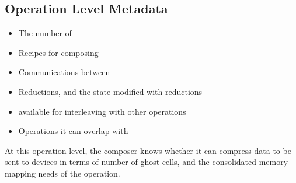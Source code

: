 \documentclass{article}
\begin{document}

\subsection{Operation Level Metadata}
\begin{itemize}
\item The number of \OLARs
\item Recipes for composing \OLARs
\item Communications between \OLARs
\item Reductions, and the state modified with reductions
\item \OLAR available for interleaving with other operations
\item Operations it can overlap with
\end{itemize}
At this operation level, the composer knows whether it can compress data to be
sent to devices in terms of number of ghost cells, and the consolidated
memory mapping needs of the operation.
\end{document}
